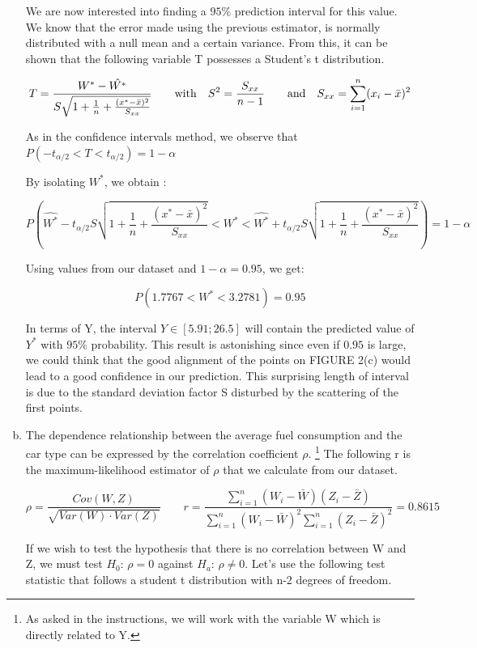\documentclass[a4paper]{article}
\begin{document}
\begin{enumerate}[(a)]
We are now interested into finding a $95\%$ prediction interval for this value. We know that the error made using the previous estimator, is normally distributed with a null mean and a certain variance. From this, it can be shown that the following variable T possesses a Student's t distribution.

$$T = \frac{W^*-\hat{W^*}}{S\sqrt{1+\frac{1}{n}+\frac{(x^*-\bar{x})^2}{S_{xx}}}} \qquad \textup{with} \quad S^2= \frac{S_{xx}}{n-1} \qquad \textup{and} \quad S_{xx} = \sum_{i=1}^n (x_i-\bar{x})^2  $$

As in the confidence intervals method, we observe that $P(-t_{\alpha /2} < T < t_{\alpha /2}) = 1-\alpha$

By isolating $W^*$, we obtain :

$$P\left ( \hat{W^*}-t_{\alpha/2}S\sqrt{1+\frac{1}{n}+\frac{(x^*-\bar{x})^2}{S_{xx}}} < W^* < \hat{W^*}+t_{\alpha/2}S\sqrt{1+\frac{1}{n}+\frac{(x^*-\bar{x})^2}{S_{xx}}} \right ) = 1-\alpha$$

Using values from our dataset and $1-\alpha = 0.95$, we get:

$$P\left (1.7767 < W^* < 3.2781 \right ) = 0.95$$

In terms of Y, the interval $Y \in \left [ 5.91;26.5 \right ]$ will contain the predicted value of $Y^*$ with $95\%$ probability. This result is astonishing since even if $0.95$ is large, we could think that the good alignment of the points on FIGURE 2(c) would lead to a good confidence in our prediction. This surprising length  of interval is due to the standard deviation factor S disturbed by the scattering of the first points.

\item The dependence relationship between the average fuel consumption and the car type can be expressed by the correlation coefficient $\rho$. \footnote{As asked in the instructions, we will work with the variable W which is directly related to Y.} The following r is the maximum-likelihood estimator of $\rho$ that we calculate from our dataset.

$$\rho = \frac{Cov(W,Z)}{\sqrt{Var(W)\cdot Var(Z)}} \qquad r = \frac{\sum_{i=1}^n (W_i-\bar{W})(Z_i-\bar{Z})}{\sum_{i=1}^n(W_i-\bar{W})^2\sum_{i=1}^n(Z_i-\bar{Z})^2} = 0.8615$$

If we wish to test the hypothesis that there is no correlation between W and Z, we must test $H_0$: $\rho = 0$ against $H_a$: $\rho \neq 0$. Let's use the following test statistic that follows a student t distribution with n-2 degrees of freedom. 


\end{enumerate}
\end{document}
